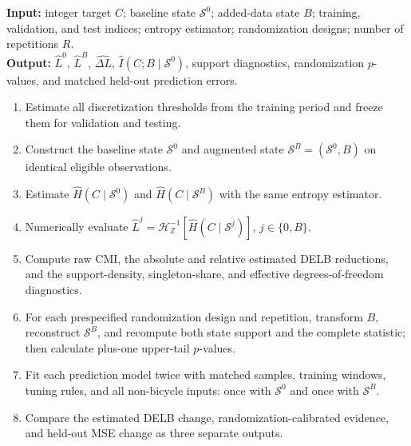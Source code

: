 \documentclass[applsci,article,accept,moreauthors]{Definitions/mdpi}
\def\hl#1{#1}%
\def\colorbox#1#2{#2}%
\begin{document}
\begin{algorithm}[H]
\caption{\hl{DELB} %
-based evaluation of an added urban data \colorbox{green}{source}%
}
\label{alg:delb_evaluation}
\begin{algorithmic}

\State\textbf{Input:} integer target \(C\); baseline state \(\mathcal S^0\);
added-data state \(B\); training, validation, and test indices; entropy
estimator; randomization designs; number of repetitions \(R\).\\
\textbf{Output:} \(\widehat L^0\), \(\widehat L^B\),
\(\widehat{\Delta L}\), \(\widehat I(C;B\mid\mathcal S^0)\), support
diagnostics, randomization \(p\)-values, and matched held-out prediction
errors.
\begin{enumerate}
    \item Estimate all discretization thresholds from the training period
    and freeze them for validation and testing.
    \item Construct the baseline state \(\mathcal S^0\) and augmented state
    \(\mathcal S^B=(\mathcal S^0,B)\) on identical eligible observations.
    \item Estimate \(\widehat H(C\mid\mathcal S^0)\) and
    \(\widehat H(C\mid\mathcal S^B)\) with the same entropy estimator.
    \item Numerically evaluate
    \(\widehat L^j=\mathcal H_{\mathbb Z}^{-1}
    [\widehat H(C\mid\mathcal S^j)]\), \(j\in\{0,B\}\).
    \item Compute raw CMI, the absolute and relative estimated DELB
    reductions, and the support-density, singleton-share, and effective
    degrees-of-freedom diagnostics.
    \item For each prespecified randomization design and repetition, transform
    \(B\), reconstruct \(\mathcal S^B\), and recompute both state support and
    the complete statistic; then calculate plus-one upper-tail \(p\)-values.
    \item Fit each prediction model twice with matched samples, training
    windows, tuning rules, and all non-bicycle inputs: once with
    \(\mathcal S^0\) and once with \(\mathcal S^B\).
    \item Compare the estimated DELB change, randomization-calibrated evidence,
    and held-out MSE change as three separate outputs.
\end{enumerate}
\end{algorithmic}
\end{algorithm}
\end{document}
